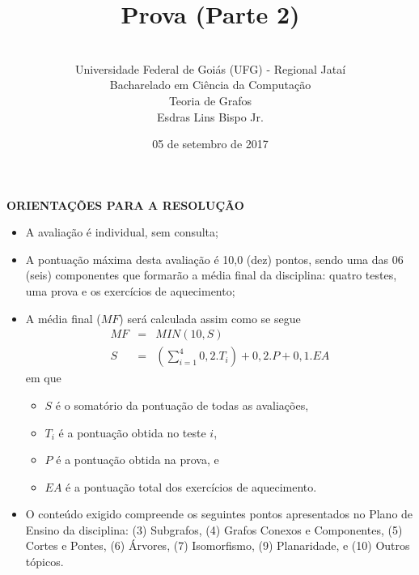 \documentclass[12pt,a4paper,oneside]{article}
\author{\\Universidade Federal de Goiás (UFG) - Regional Jataí\\Bacharelado em Ciência da Computação \\Teoria de Grafos \\Esdras Lins Bispo Jr.}
\title{\sc \huge Prova (Parte 2)}
\date{05 de setembro de 2017}
\begin{document}
\maketitle

{\bf ORIENTAÇÕES PARA A RESOLUÇÃO}

\footnotesize

\begin{itemize}
	\item A avaliação é individual, sem consulta;
	\item A pontuação máxima desta avaliação é 10,0 (dez) pontos, sendo uma das 06 (seis) componentes que formarão a média final da disciplina: quatro testes, uma prova e os exercícios de aquecimento;
	\item A média final ($MF$) será calculada assim como se segue
	\begin{eqnarray}
		MF & = & MIN(10, S) \nonumber \\
		S & = & (\sum_{i=1}^{4} 0,2.T_i ) + 0,2.P  + 0,1.EA \nonumber
	\end{eqnarray}
	em que 
	\begin{itemize}
		\item $S$ é o somatório da pontuação de todas as avaliações,
		\item $T_i$ é a pontuação obtida no teste $i$,
		\item $P$ é a pontuação obtida na prova, e
		\item $EA$ é a pontuação total dos exercícios de aquecimento.
	\end{itemize}
	\item O conteúdo exigido compreende os seguintes pontos apresentados no Plano de Ensino da disciplina: (3) Subgrafos, (4) Grafos Conexos e Componentes, (5) Cortes e Pontes, (6) Árvores, (7) Isomorfismo, (9) Planaridade, e (10) Outros tópicos.
\end{itemize}


\begin{center}
\end{center}

\newpage

\normalsize
\end{document}
